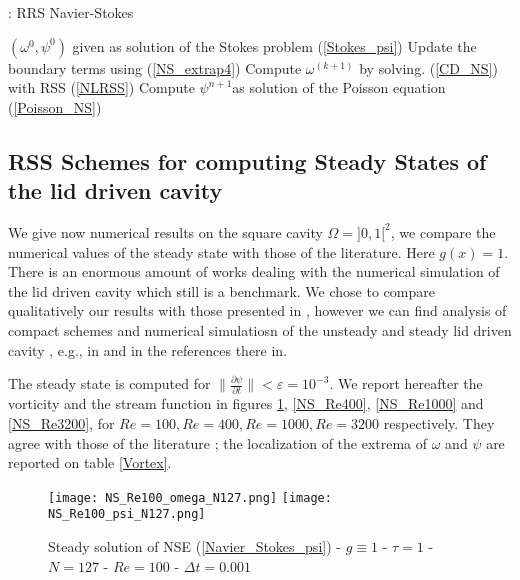 \documentclass[11pt]{article}
\begin{document}
{\begin{center}
\begin{minipage}[H]{12cm}
  \begin{algorithm}[H]
    \caption{: RRS Navier-Stokes}\label{NS}
    \begin{algorithmic}[1]
        \State  $(\omega^0, \psi^0)$ given as solution of the Stokes problem (\ref{Stokes_psi})
             \State Update  the boundary terms using  (\ref{NS_extrap4})
              \State Compute  $\omega^{(k+1)}$ by solving. (\ref{CD_NS}) with RSS (\ref{NLRSS})
               \State Compute $\psi^{n+1}$as solution of the  Poisson equation (\ref{Poisson_NS})      
            \EndFor
    \end{algorithmic}
    \end{algorithm}
\end{minipage}
\end{center}




\subsection{RSS Schemes for computing Steady States of the lid driven cavity}

We give now numerical results on the square cavity $\Omega=]0,1[^2$, we compare the numerical values of the steady state with those of the literature. Here $g(x)=1$.
There is an enormous amount of works dealing with the numerical simulation of the lid driven cavity which still is a benchmark. We chose to compare qualitatively our results with
those presented in \cite{BenArtziCroisille,BruneauJouron,Ghia,Goyon}, however we can find
analysis of compact schemes and numerical simulatiosn of the unsteady and steady lid driven cavity , e.g., in \cite{ChengWang,LiTangFornberg} and in the references there in.


The steady state is computed for $\| \frac{\partial \psi }{\partial t}  \| < \varepsilon = 10^{-3}$. We report hereafter the vorticity and the stream function in figures \ref{NS_Re100}, \ref{NS_Re400}, \ref{NS_Re1000} and \ref{NS_Re3200}, for $Re=100, Re=400, Re=1000, Re=3200$ respectively. They agree with those of the literature \cite{BenArtziCroisille,BruneauJouron,Ghia,Goyon}; the localization of the extrema of $\omega$ and $\psi$ are reported on table \ref{Vortex}.

\begin{figure}[!h]
\begin{center}
\texttt{[image: NS\_Re100\_omega\_N127.png]}
\texttt{[image: NS\_Re100\_psi\_N127.png]}\\
\caption{Steady solution of NSE (\ref{Navier_Stokes_psi}) - $g \equiv 1$ - $\tau = 1$ -  $N=127$ - $Re = 100$ - $\Delta t = 0.001$}
\label{NS_Re100}
\end{center}
\end{figure}

}
\end{document}
